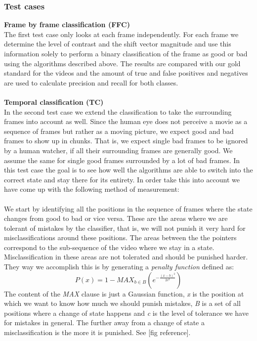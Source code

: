 \documentclass[12pt]{article}
\begin{document}
\subsubsection{Test cases} \label{sec:testcases}
%
\textbf{Frame by frame classification (FFC)}\\
%
The first test case only looks at each frame independently. For each frame we determine the level of contrast and the shift vector magnitude and use this information solely to perform a binary classification of the frame as good or bad using the algorithms described above. The results are compared with our gold standard for the videos and the amount of true and false positives and negatives are used to calculate precision and recall for both classes.\\\\
%
\textbf{Temporal classification (TC)} \label{sec:tctestcase}\\
%
In the second test case we extend the classification to take the surrounding frames into account as well. Since the human eye does not perceive a movie as a sequence of frames but rather as a moving picture, we expect good and bad frames to show up in chunks. That is, we expect single bad frames to be ignored by a human watcher, if all their surrounding frames are generally good. We assume the same for single good frames surrounded by a lot of bad frames. In this test case the goal is to see how well the algorithms are able to switch into the correct state and stay there for its entirety. In order take this into account we have come up with the following method of measurement:\\\\
%
We start by identifying all the positions in the sequence of frames where the state changes from good to bad or vice versa. These are the areas where we are tolerant of mistakes by the classifier, that is, we will not punish it very hard for misclassifications around these positions. The areas between the the pointers correspond to the sub-sequence of the video where we stay in a state. Misclassification in these areas are not tolerated and should be punished harder. They way we accomplish this is by generating a \emph{penalty function} defined as:
%
\begin{displaymath}
P(x) =1 - MAX_{b\in B}(e^{-\frac{(x-b)^{2}}{2c^{2}}})
\end{displaymath}
%
The content of the \emph{MAX} clause is just a Gaussian function, \emph{x} is the position at which we want to know how much we should punish mistakes, \emph{B} is a set of all positions where a change of state happens and \emph{c} is the level of tolerance we have for mistakes in general. The further away from a change of state a misclassification is the more it is punished. See [fig reference].
\end{document}
